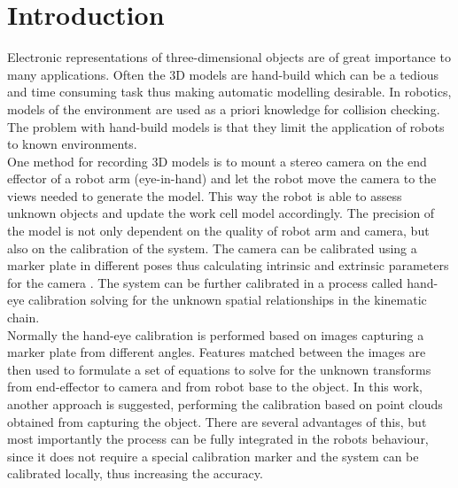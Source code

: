 \chapter{Introduction}
Electronic representations of three-dimensional objects are of great importance to many applications. Often the 3D models are hand-build which can be a tedious and time consuming task thus making automatic modelling desirable. In robotics, models of the environment are used as a priori knowledge for collision checking. The problem with hand-build models is that they limit the application of robots to known environments. \\

One method for recording 3D models is to mount a stereo camera on the end effector of a robot arm (eye-in-hand) and let the robot move the camera to the views needed to generate the model. This way the robot is able to assess unknown objects and update the work cell model accordingly. The precision of the model is not only dependent on the quality of robot arm and camera, but also on the calibration of the system. The camera can be calibrated using a marker plate in different poses thus calculating intrinsic and extrinsic parameters for the camera \cite{Zhang2000}. The system can be further calibrated in a process called hand-eye calibration solving for the unknown spatial relationships in the kinematic chain.\\


Normally the hand-eye calibration is performed based on images capturing a marker plate from different angles. Features matched between the images are then used to formulate a set of equations to solve for the unknown transforms from end-effector to camera and from robot base to the object. In this work, another approach is suggested, performing the calibration based on point clouds obtained from capturing the object. There are several advantages of this, but most importantly the process can be fully integrated in the robots behaviour, since it does not require a special calibration marker and the system can be calibrated locally, thus increasing the accuracy.\\

